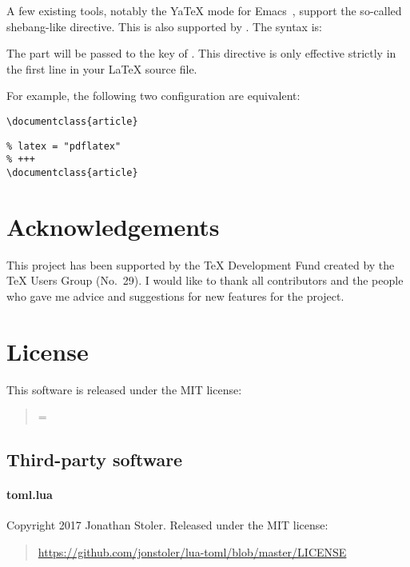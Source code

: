 \documentclass[draft]{llmk-doc}
\begin{document}
A few existing tools, notably the YaTeX mode for Emacs~\cite{yatex}, support
the so-called shebang-like directive. This is also supported by .
The syntax is:
%
\begin{htcode}
\end{htcode}
%
The  part will be passed to the  key of .
This directive is only effective strictly in the first line in your {\LaTeX}
source file.

For example, the following two configuration are equivalent:\\
%
\begin{minipage}[t]{.5\textwidth}
\begin{lstlisting}[style=latex]
%#!pdflatex
\documentclass{article}
\end{lstlisting}
\end{minipage}
\begin{minipage}[t]{.49\textwidth}
\begin{lstlisting}[style=latex]
% +++
% latex = "pdflatex"
% +++
\documentclass{article}
\end{lstlisting}
\end{minipage}

\section{Acknowledgements}

This project has been supported by the {\TeX} Development Fund created by the {\TeX}
Users Group (No.~29). I would like to thank all contributors and the people who
gave me advice and suggestions for new features for the  project.

\section{License}

This software is released under the MIT license:
%
\begin{quotation}
\parindent=0pt
\parskip=\baselineskip
\small\ttfamily
\noindent
\printLICENSE
\end{quotation}

\subsection*{Third-party software}

\paragraph{toml.lua} Copyright 2017 Jonathan Stoler. Released under the MIT
license:
%
\begin{quote}
\url{https://github.com/jonstoler/lua-toml/blob/master/LICENSE}
\end{quote}
\end{document}

